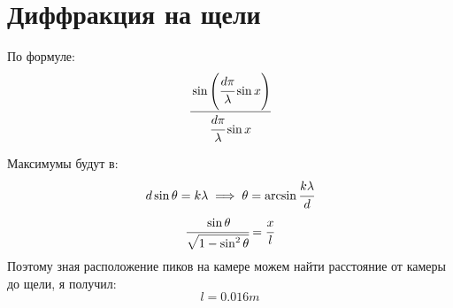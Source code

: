 \section{Диффракция на щели}
По формуле:
\begin{equation}
    \cfrac{\sin \left( \cfrac{d\pi}{\lambda}\sin{x} \right)}{\cfrac{d\pi}{\lambda}\sin{x}}
\end{equation}

Максимумы будут в:
\begin{equation}
    d\sin{\theta} = k \lambda \implies \theta = \arcsin{\cfrac{k\lambda}{d}}
\end{equation}
\begin{equation}
    \cfrac{\sin{\theta}}{\sqrt{1 - \sin^2 \theta}} = \cfrac{x}{l}
\end{equation}
Поэтому зная расположение пиков на камере можем найти расстояние от камеры до 
щели, я получил:
\begin{equation}
    l = 0.016 m
\end{equation}


